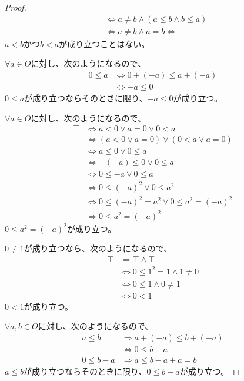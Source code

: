 \documentclass[dvipdfmx]{jsarticle}
\begin{document}
\begin{proof}
\begin{align*}
&\Leftrightarrow a \neq b \land (a \leq b \land b \leq a)\\ 
&\Leftrightarrow a \neq b \land a = b \Leftrightarrow \bot
\end{align*}
$a < b$かつ$b < a$が成り立つことはない。\par
$\forall a \in O$に対し、次のようになるので、
\begin{align*}
0 \leq a &\Leftrightarrow 0 + ( - a) \leq a + ( - a)\\ 
&\Leftrightarrow - a \leq 0
\end{align*}
$0 \leq a$が成り立つならそのときに限り、$- a \leq 0$が成り立つ。\par
$\forall a \in O$に対し、次のようになるので、
\begin{align*}
\top &\Leftrightarrow a < 0 \vee a = 0 \vee 0 < a\\ 
&\Leftrightarrow (a < 0 \vee a = 0) \vee (0 < a \vee a = 0)\\ 
&\Leftrightarrow a \leq 0 \vee 0 \leq a\\ 
&\Leftrightarrow - ( - a) \leq 0 \vee 0 \leq a\\ 
&\Leftrightarrow 0 \leq - a \vee 0 \leq a\\ 
&\Leftrightarrow 0 \leq ( - a)^{2} \vee 0 \leq a^{2}\\ 
&\Leftrightarrow 0 \leq ( - a)^{2} = a^{2} \vee 0 \leq a^{2} = ( - a)^{2}\\ 
&\Leftrightarrow 0 \leq a^{2} = ( - a)^{2}
\end{align*}
$0 \leq a^{2} = ( - a)^{2}$が成り立つ。\par
$0 \neq 1$が成り立つなら、次のようになるので、
\begin{align*}
\top &\Leftrightarrow \top \land \top\\ 
&\Leftrightarrow 0 \leq 1^{2} = 1 \land 1 \neq 0\\ 
&\Leftrightarrow 0 \leq 1 \land 0 \neq 1\\ 
&\Leftrightarrow 0 < 1
\end{align*}
$0 < 1$が成り立つ。\par
$\forall a,b \in O$に対し、次のようになるので、
\begin{align*}
a \leq b &\Rightarrow a + ( - a) \leq b + ( - a)\\ 
&\Leftrightarrow 0 \leq b - a\\ 
0 \leq b - a &\Rightarrow a \leq b - a + a = b
\end{align*}
$a \leq b$が成り立つならそのときに限り、$0 \leq b - a$が成り立つ。\par

\end{proof}
\end{document}
